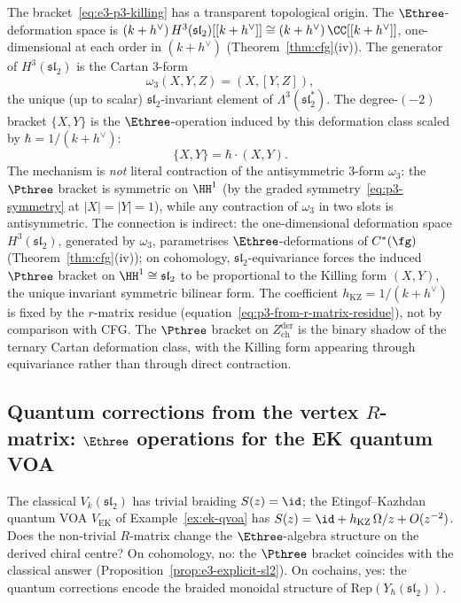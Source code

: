 \begin{remark}
\label{rem:cartan-3-form}
The bracket~\eqref{eq:e3-p3-killing} has a transparent
topological origin. The $\Ethree$-deformation space is
$(k+h^\vee)\,H^3(\mathfrak{sl}_2)[[k+h^\vee]] \cong (k+h^\vee)\,\CC[[k+h^\vee]]$,
one-dimensional at each order in $(k+h^\vee)$
(Theorem~\ref{thm:cfg}(iv)). The generator of
$H^3(\mathfrak{sl}_2)$ is the Cartan $3$-form
\begin{equation}\label{eq:cartan-3form}
  \omega_3(X, Y, Z)
  = (X, [Y, Z]),
\end{equation}
the unique (up to scalar) $\mathfrak{sl}_2$-invariant element
of $\Lambda^3(\mathfrak{sl}_2^*)$. The degree-$(-2)$ bracket
$\{X, Y\}$ is the $\Ethree$-operation induced by this
deformation class scaled by
$\hbar = 1/(k + h^\vee)$:
\[
  \{X, Y\}
  = \hbar \cdot (X, Y).
\]
The mechanism is \emph{not} literal contraction of the
antisymmetric $3$-form $\omega_3$: the $\Pthree$ bracket
is symmetric on $\HH^1$ (by the graded
symmetry~\eqref{eq:p3-symmetry} at $|X| = |Y| = 1$),
while any contraction of $\omega_3$ in two slots is
antisymmetric. The connection is indirect:
the one-dimensional deformation space
$H^3(\mathfrak{sl}_2)$, generated by $\omega_3$,
parametrises $\Ethree$-deformations of $C^*(\fg)$
(Theorem~\ref{thm:cfg}(iv));
on cohomology, $\mathfrak{sl}_2$-equivariance forces
the induced $\Pthree$ bracket on
$\HH^1 \cong \mathfrak{sl}_2$ to be proportional to
the Killing form $(X, Y)$, the unique invariant
symmetric bilinear form. The coefficient
$h_{\mathrm{KZ}} = 1/(k + h^\vee)$ is fixed by the
$r$-matrix residue
(equation~\eqref{eq:p3-from-r-matrix-residue}), not by
comparison with CFG.
The $\Pthree$ bracket on $Z^{\mathrm{der}}_{\mathrm{ch}}$
is the binary shadow of the ternary Cartan deformation class,
with the Killing form appearing through equivariance rather
than through direct contraction.
\end{remark}

\subsection{Quantum corrections from the vertex $R$-matrix:
$\Ethree$ operations for the EK quantum VOA}
\label{subsec:e3-ek-quantum}

The classical $V_k(\mathfrak{sl}_2)$ has trivial braiding
$S(z) = \id$; the Etingof--Kazhdan quantum VOA
$V_{\mathrm{EK}}$ of Example~\ref{ex:ek-qvoa} has
$S(z) = \id + h_{\mathrm{KZ}}\,\Omega/z + O(z^{-2})$. Does
the non-trivial $R$-matrix change the $\Ethree$-algebra
structure on the derived chiral centre? On cohomology, no:
the $\Pthree$ bracket coincides with the classical answer
(Proposition~\ref{prop:e3-explicit-sl2}). On cochains, yes:
the quantum corrections encode the braided monoidal structure
of $\mathrm{Rep}(Y_\hbar(\mathfrak{sl}_2))$.

